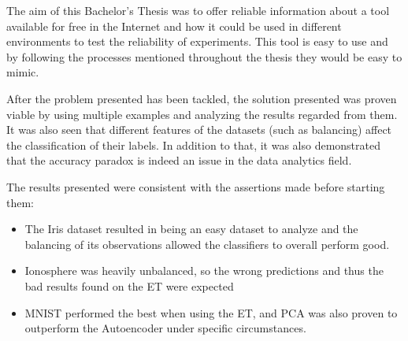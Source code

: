 

The aim of this Bachelor's Thesis was to offer reliable information about a tool available for free in the Internet and how it could be used in different environments to test the reliability of experiments. This tool is easy to use and by following the processes mentioned throughout the thesis they would be easy to mimic. \par

After the problem presented has been tackled, the solution presented was proven viable by using multiple examples and analyzing the results regarded from them. It was also seen that different features of the datasets (such as balancing) affect the classification of their labels. In addition to that, it was also demonstrated that the accuracy paradox is indeed an issue in the data analytics field.

The results presented were consistent with the assertions made before starting them:
\begin{itemize}
	\item The Iris dataset resulted in being an easy dataset to analyze and the balancing of its observations allowed the classifiers to overall perform good.
	
	\item Ionosphere was heavily unbalanced, so the wrong predictions and thus the bad results found on the ET were expected
	
	\item MNIST performed the best when using the ET, and PCA was also proven to outperform the Autoencoder  under specific circumstances.
	
\end{itemize}



